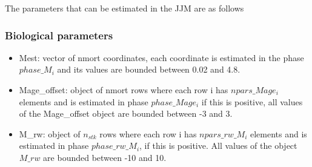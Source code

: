 \documentclass{article}
\begin{document}
The parameters that can be estimated in the JJM are as follows
\subsubsection{Biological parameters}
\begin{itemize}
    
    \item Mest: vector of nmort coordinates, each coordinate is estimated in the phase $phase\_M_i$ and its values are bounded between 0.02 and 4.8.
    

    \item Mage\_offset: object of nmort rows where each row i has $npars\_Mage_i$ elements and is estimated in phase $phase\_Mage_i$ if this is positive, all values of the Mage\_offset object are bounded between -3 and 3.
    
    
    \item M\_rw: object of $n_{stk}$ rows where each row i has $npars\_rw\_M_i$ elements and is estimated in phase $phase\_rw\_M_i$, if this is positive. All values of the object $M\_rw$ are bounded between -10 and 10.
\end{itemize}
\end{document}
